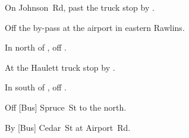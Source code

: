 
\begin{LocationList}

On Johnson~Rd, past the truck stop by   .

Off the  by-pass at the airport in eastern Rawlins.

In  north of , off   .

At the Haulett truck stop by   .

In  south of , off   .

Off [Bus]  Spruce~St to the north.

By [Bus]  Cedar~St at Airport~Rd.

\end{LocationList}
